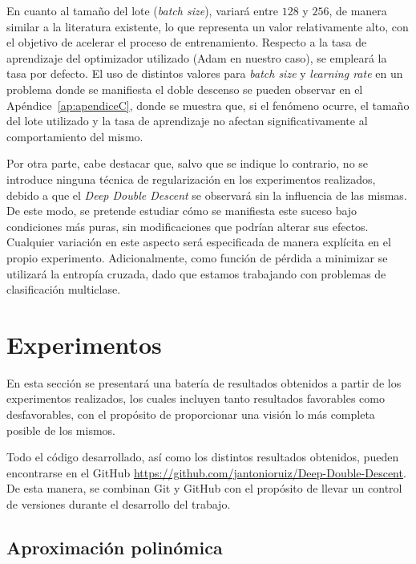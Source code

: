 En cuanto al tamaño del lote (\textit{batch size}), variará entre $128$ y $256$, de manera similar a la literatura existente, lo que representa un valor relativamente alto, con el objetivo de acelerar el proceso de entrenamiento. Respecto a la tasa de aprendizaje del optimizador utilizado (Adam en nuestro caso), se empleará la tasa por defecto. El uso de distintos valores para \textit{batch size} y \textit{learning rate} en un problema donde se manifiesta el doble descenso se pueden observar en el Apéndice~\ref{ap:apendiceC}, donde se muestra que, si el fenómeno ocurre, el tamaño del lote utilizado y la tasa de aprendizaje no afectan significativamente al comportamiento del mismo.\newline

Por otra parte, cabe destacar que, salvo que se indique lo contrario, no se introduce ninguna técnica de regularización en los experimentos realizados, debido a que el \textit{Deep Double Descent} se observará sin la influencia de las mismas. De este modo, se pretende estudiar cómo se manifiesta este suceso bajo condiciones más puras, sin modificaciones que podrían alterar sus efectos. Cualquier variación en este aspecto será especificada de manera explícita en el propio experimento. Adicionalmente, como función de pérdida a minimizar se utilizará la entropía cruzada, dado que estamos trabajando con problemas de clasificación multiclase.\newline

\section{Experimentos}\label{sec:experimentos}

En esta sección se presentará una batería de resultados obtenidos a partir de los experimentos realizados, los cuales incluyen tanto resultados favorables como desfavorables, con el propósito de proporcionar una visión lo más completa posible de los mismos.\newline

Todo el código desarrollado, así como los distintos resultados obtenidos, pueden encontrarse en el GitHub \url{https://github.com/jantonioruiz/Deep-Double-Descent}. De esta manera, se combinan Git y GitHub con el propósito de llevar un control de versiones durante el desarrollo del trabajo.\newline

\subsection{Aproximación polinómica}\label{subsec:approx-polinomica}

